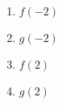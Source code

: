 \documentclass{ximera}
\begin{document}







\begin{enumerate}


\item \label{functionvaluesfromgraphfirst} $f(-2)$

\item $g(-2)$

\item $f(2)$

\item  $g(2)$


\end{enumerate}
\end{document}
